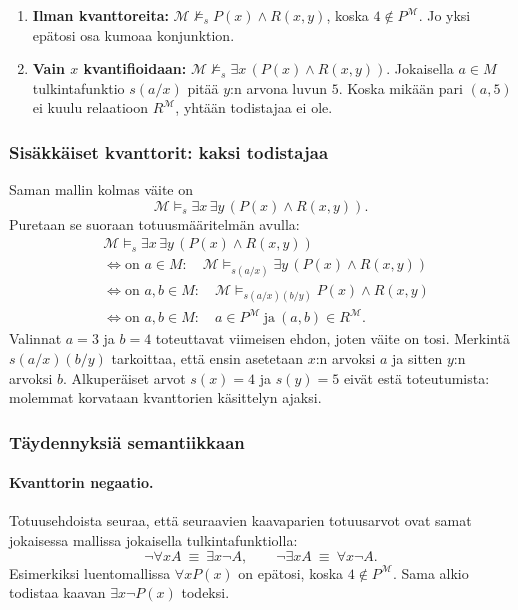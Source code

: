 \documentclass[11pt,a4paper]{amsart}
\begin{document}
\begin{enumerate}
  \item \textbf{Ilman kvanttoreita:}
    $\mathcal M\not\models_s P(x)\land R(x,y)$, koska
    $4\notin P^{\mathcal M}$. Jo yksi epätosi osa kumoaa konjunktion.
  \item \textbf{Vain $x$ kvantifioidaan:}
    $\mathcal M\not\models_s\exists x\,(P(x)\land R(x,y))$.
    Jokaisella $a\in M$ tulkintafunktio $s(a/x)$ pitää $y$:n arvona
    luvun $5$. Koska mikään pari $(a,5)$ ei kuulu relaatioon
    $R^{\mathcal M}$, yhtään todistajaa ei ole.
\end{enumerate}

\clearpage
\subsubsection{Sisäkkäiset kvanttorit: kaksi todistajaa}

Saman mallin kolmas väite on
\[
  \mathcal M\models_s\exists x\,\exists y\,(P(x)\land R(x,y)).
\]
Puretaan se suoraan totuusmääritelmän avulla:
\begin{align*}
  &\mathcal M\models_s\exists x\,\exists y\,(P(x)\land R(x,y))\\
  &\iff \text{on }a\in M:\quad
  \mathcal M\models_{s(a/x)}\exists y\,(P(x)\land R(x,y))\\
  &\iff \text{on }a,b\in M:\quad
  \mathcal M\models_{s(a/x)(b/y)}P(x)\land R(x,y)\\
  &\iff \text{on }a,b\in M:\quad
  a\in P^{\mathcal M}\ \text{ja}\ (a,b)\in R^{\mathcal M}.
\end{align*}
Valinnat $a=3$ ja $b=4$ toteuttavat viimeisen ehdon, joten väite on
tosi. Merkintä $s(a/x)(b/y)$ tarkoittaa, että ensin asetetaan
$x$:n arvoksi $a$ ja sitten $y$:n arvoksi $b$.
Alkuperäiset arvot $s(x)=4$ ja $s(y)=5$ eivät estä toteutumista:
molemmat korvataan kvanttorien käsittelyn ajaksi.

\subsubsection{Täydennyksiä semantiikkaan}

\paragraph{Kvanttorin negaatio.}
Totuusehdoista seuraa, että seuraavien kaavaparien totuusarvot
ovat samat jokaisessa mallissa jokaisella tulkintafunktiolla:
\[
  \neg\forall x A\ \equiv\ \exists x\neg A,
  \qquad
  \neg\exists x A\ \equiv\ \forall x\neg A.
\]
Esimerkiksi luentomallissa $\forall x P(x)$ on epätosi, koska
$4\notin P^{\mathcal M}$. Sama alkio todistaa kaavan
$\exists x\neg P(x)$ todeksi.
\end{document}
